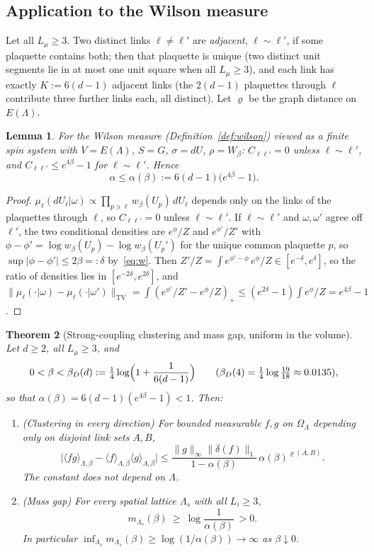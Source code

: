 \documentclass[11pt,a4paper]{article}
\newtheorem{theorem}{Theorem}[section]
\newtheorem{lemma}[theorem]{Lemma}
\theoremstyle{definition}
\theoremstyle{remark}
\newcommand{\dU}{\,dU}
\newcommand{\norm}[1]{\lVert #1\rVert}
\newcommand{\TV}{\mathrm{TV}}
\begin{document}
\subsection{Application to the Wilson measure}

Let all $L_\mu\ge3$. Two distinct links $\ell\ne\ell'$ are \emph{adjacent}, $\ell\sim\ell'$, if some plaquette contains both;
then that plaquette is unique (two distinct unit segments lie in at most one unit square when all $L_\mu\ge3$), and each
link has exactly $K:=6(d-1)$ adjacent links (the $2(d-1)$ plaquettes through $\ell$ contribute three further links each, all
distinct). Let $\varrho$ be the graph distance on $E(\Lambda)$.

\begin{lemma}\label{lem:dobrushinbound}
For the Wilson measure (Definition~\ref{def:wilson}) viewed as a finite spin system with $V=E(\Lambda)$, $S=G$, $\sigma=dU$,
$\rho=W_\beta$: $C_{\ell\ell'}=0$ unless $\ell\sim\ell'$, and $C_{\ell\ell'}\le e^{4\beta}-1$ for $\ell\sim\ell'$. Hence
\[
\alpha\le\alpha(\beta):=6(d-1)\bigl(e^{4\beta}-1\bigr).
\]
\end{lemma}

\begin{proof}
$\mu_\ell(dU_\ell|\omega)\propto\prod_{p\ni\ell}w_\beta(U_p)\dU_\ell$ depends only on the links of the plaquettes through $\ell$, so
$C_{\ell\ell'}=0$ unless $\ell\sim\ell'$. If $\ell\sim\ell'$ and $\omega,\omega'$ agree off $\ell'$, the two conditional densities are
$e^{\phi}/Z$ and $e^{\phi'}/Z'$ with $\phi-\phi'=\log w_\beta(U_p)-\log w_\beta(U_p')$ for the unique common plaquette $p$, so
$\sup|\phi-\phi'|\le2\beta=:\delta$ by~\eqref{eq:w}. Then $Z'/Z=\int e^{\phi'-\phi}\,e^\phi/Z\in[e^{-\delta},e^\delta]$, so the ratio of
densities lies in $[e^{-2\delta},e^{2\delta}]$, and
$\norm{\mu_\ell(\cdot|\omega)-\mu_\ell(\cdot|\omega')}_\TV=\int(e^{\phi'}/Z'-e^\phi/Z)_+\le(e^{2\delta}-1)\int e^\phi/Z=e^{4\beta}-1$.
\end{proof}

\begin{theorem}[Strong-coupling clustering and mass gap, uniform in the volume]\label{thm:strong}
Let $d\ge2$, all $L_\mu\ge3$, and
\[
0<\beta<\beta_D(d):=\tfrac14\log\Bigl(1+\frac1{6(d-1)}\Bigr)\qquad(\beta_D(4)=\tfrac14\log\tfrac{19}{18}\approx0.0135),
\]
so that $\alpha(\beta)=6(d-1)(e^{4\beta}-1)<1$. Then:
\begin{enumerate}[label=(\roman*)]
\item (Clustering in every direction) For bounded measurable $f,g$ on $\Omega_\Lambda$ depending only on disjoint link sets $A,B$,
\[
\bigl|\langle fg\rangle_{\Lambda,\beta}-\langle f\rangle_{\Lambda,\beta}\langle g\rangle_{\Lambda,\beta}\bigr|
\le\frac{\norm g_\infty\norm{\delta(f)}_1}{1-\alpha(\beta)}\,\alpha(\beta)^{\varrho(A,B)} .
\]
The constant does not depend on $\Lambda$.
\item (Mass gap) For every spatial lattice $\Lambda_s$ with all $L_i\ge3$,
\[
m_{\Lambda_s}(\beta)\ \ge\ \log\frac1{\alpha(\beta)}\ >0 .
\]
In particular $\inf_{\Lambda_s}m_{\Lambda_s}(\beta)\ge\log(1/\alpha(\beta))\to\infty$ as $\beta\downarrow0$.
\end{enumerate}
\end{theorem}
\end{document}
